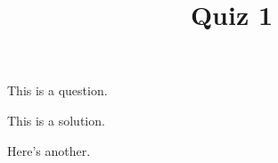 \documentclass[12pt,letterpaper,group,answers]{quiz}
\title{Quiz 1}
\begin{document}
\begin{questions}
  \question[4] This is a question.
  \begin{solutionbox}{3in}
    This is a solution.
  \end{solutionbox}
  \newpage 
  \question[5] Here's another.
\end{questions}
\end{document}
